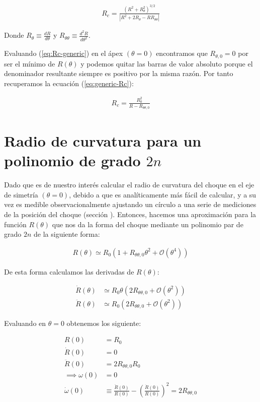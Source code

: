 \begin{align}
R_c = \frac{\left(R^2 + R^2_\theta\right)^{3/2}}{\left|R^2 + 2R_\theta -RR_{\theta\theta}\right|}\label{eq:Rc-generic}
\end{align}

Donde $R_\theta \equiv \frac{dR}{d\theta}$ y $R_{\theta\theta} \equiv \frac{d^2R}{d\theta^2}$.

Evaluando (\ref{eq:Rc-generic}) en el ápex $(\theta = 0)$ encontramos que $R_{\theta, 0} = 0$ por ser el mínimo de $R(\theta)$ y podemos quitar las barras de valor absoluto porque el denominador resultante siempre es positivo por la misma razón. Por tanto recuperamos la ecuación (\ref{eq:generic-Rc}):

\begin{align}
R_c = \frac{R_0^2}{R- R_{\theta\theta, 0}}\label{eq:Rc-apex}
\end{align}

\section[Polinomio Grado $2n$]{Radio de curvatura para un polinomio de grado $2n$}
\label{app:curvature-radius-poly}

Dado que es de nuestro interés calcular el radio de curvatura del choque en el eje de simetría
$(\theta=0)$, debido a que es analíticamente más fácil de calcular, y a su vez es medible
observacionalmente ajustando un círculo a una serie de mediciones de la posición del choque (sección ).
Entonces, hacemos una aproximación para la función $R(\theta)$ que nos da la forma del choque
mediante un polinomio par de grado $2n$ de la siguiente forma:

\begin{align}
R(\theta) \simeq R_0\left(1 + R_{\theta \theta, 0}\theta^2 + \mathcal{O}(\theta^4)\right)
\end{align}

De esta forma calculamos las derivadas de $R(\theta)$:

\begin{align}
  \dot{R}(\theta) &\simeq R_0\theta\left(2R_{\theta \theta, 0} + \mathcal{O}(\theta^2)\right) \\
  \ddot{R}(\theta) &\simeq R_0\left(2R_{\theta \theta, 0} + \mathcal{O}(\theta^2)\right)
\end{align}

Evaluando en $\theta = 0$ obtenemos los siguiente:

\begin{align}
  R(0) &= R_0 \\
  \dot{R}(0) &= 0 \\
  \ddot{R}(0) &= 2R_{\theta \theta, 0} R_0 \\
  \implies \omega(0) &= 0 \\
  \dot{\omega}(0) &\equiv \frac{\ddot{R}(0)}{R(0)} - \left(\frac{\dot{R}(0)}{R(0)}\right)^2 = 2R_{\theta \theta, 0}
\end{align}

